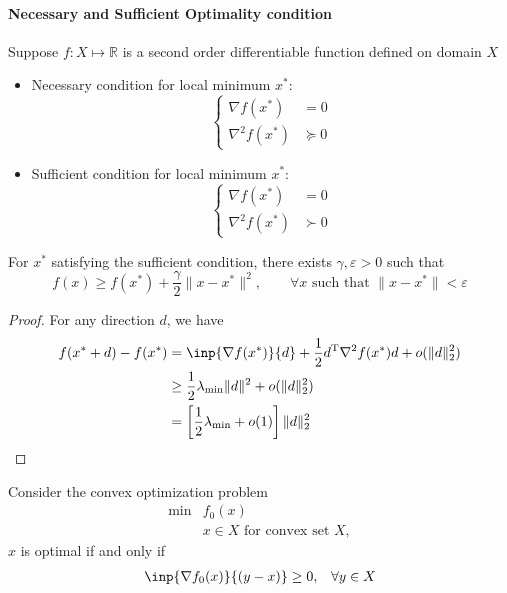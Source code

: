 \paragraph{Necessary and Sufficient Optimality condition}
\begin{proposition}
Suppose $f:X\mapsto\mathbb{R}$ is a second order differentiable function defined on domain $X$
\begin{itemize}
\item
Necessary condition for local minimum $x^*$:
\[
\left\{
\begin{aligned}
\nabla f(x^*)&=0\\
\nabla^2f(x^*)&\succeq0
\end{aligned}
\right.
\]
\item
Sufficient condition for local minimum $x^*$:
\[
\left\{
\begin{aligned}
\nabla f(x^*)&=0\\
\nabla^2f(x^*)&\succ0
\end{aligned}
\right.
\]
\end{itemize}
\end{proposition}
\begin{corollary}
For $x^*$ satisfying the sufficient condition, there exists $\gamma,\varepsilon>0$ such that
\[
f(x)\ge f(x^*)+\frac{\gamma}{2}\|x-x^*\|^2,\qquad
\forall x\mbox{ such that }\|x-x^*\|<\varepsilon
\]
\end{corollary}
\begin{proof}
For any direction $d$, we have
\begin{align*}
f(x^*+d)-f(x^*)&=\inp{\nabla f(x^*)}{d}+\frac{1}{2}d\trans\nabla^2f(x^*)d+o(\|d\|_2^2)\\
&\ge\frac{1}{2}\lambda_{\min}\|d\|^2+o(\|d\|_2^2)\\
&=\left[\frac{1}{2}\lambda_{\min}+o(1)\right]\|d\|_2^2
\end{align*}
\end{proof}
\begin{proposition}
Consider the convex optimization problem
\begin{equation}\label{Eq:8:5}
\begin{array}{ll}
\min&f_0(x)\\
&x\in X\mbox{ for convex set $X$},
\end{array}
\end{equation}
$x$ is optimal if and only if
\begin{equation}\label{Eq:8:6}
\begin{array}{ll}
\inp{\nabla f_0(x)}{(y-x)}\ge0,
&
\forall y\in X
\end{array}
\end{equation}
\end{proposition}
